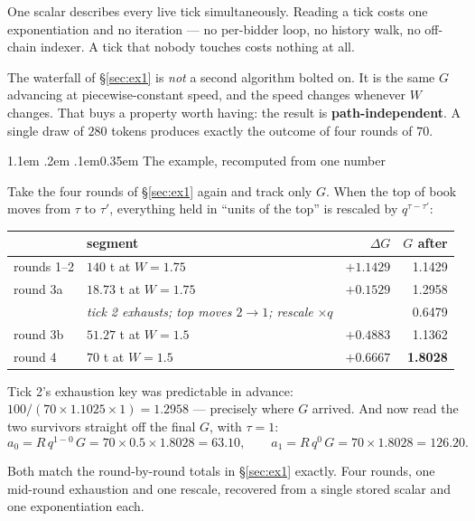 \documentclass[11pt]{article}
\makeatletter
\renewcommand\subsection{\@startsection{subsection}{2}{\z@}%
  {1.1em \@plus .2em \@minus .1em}{0.35em}%
  {\sffamily\normalsize\bfseries\color{ink}}}
\makeatother
\begin{document}
One scalar describes every live tick simultaneously. Reading a tick costs one exponentiation
and no iteration — no per-bidder loop, no history walk, no off-chain indexer. A tick that
nobody touches costs nothing at all.

The waterfall of \S\ref{sec:ex1} is \emph{not} a second algorithm bolted on. It is the same $G$
advancing at piecewise-constant speed, and the speed changes whenever $W$ changes. That buys a
property worth having: the result is \textbf{path-independent}. A single draw of $280$ tokens
produces exactly the outcome of four rounds of $70$.

\subsection{The example, recomputed from one number}

Take the four rounds of \S\ref{sec:ex1} again and track only $G$. When the top of book moves
from $\tau$ to $\tau'$, everything held in ``units of the top'' is rescaled by $q^{\tau-\tau'}$:

\begin{center}
\begin{tabular}{llrr}
\toprule
& segment & $\Delta G$ & $G$ after \\
\midrule
rounds 1--2  & $140$ t at $W=1.75$          & $+1.1429$ & 1.1429 \\
round 3a     & $18.73$ t at $W=1.75$        & $+0.1529$ & 1.2958 \\
             & \emph{tick 2 exhausts; top moves $2\!\to\!1$; rescale} $\times q$ & & 0.6479 \\
round 3b     & $51.27$ t at $W=1.5$         & $+0.4883$ & 1.1362 \\
round 4      & $70$ t at $W=1.5$            & $+0.6667$ & \textbf{1.8028} \\
\bottomrule
\end{tabular}
\end{center}

Tick 2's exhaustion key was predictable in advance:
$100/(70\times1.1025\times1) = 1.2958$ — precisely where $G$ arrived. And now read the two
survivors straight off the final $G$, with $\tau=1$:
\[
  a_0 = R\,q^{1-0}\,G = 70\times0.5\times1.8028 = 63.10,
  \qquad
  a_1 = R\,q^{0}\,G = 70\times1.8028 = 126.20 .
\]

Both match the round-by-round totals in \S\ref{sec:ex1} exactly. Four rounds, one mid-round
exhaustion and one rescale, recovered from a single stored scalar and one exponentiation
each.
\end{document}
